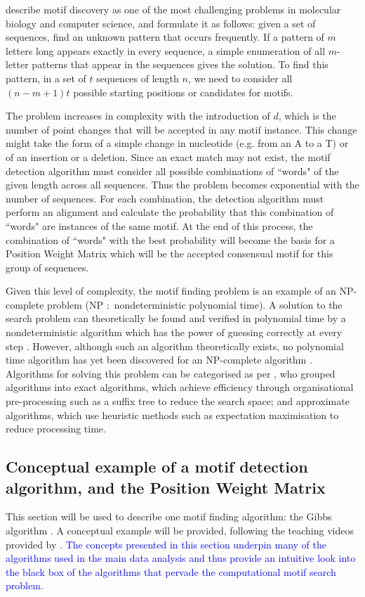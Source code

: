 \documentclass[12pt]{article}
\begin{document}
\citet{das2007survey} describe motif discovery as one of the most challenging problems in molecular biology and computer science, and formulate it as follows:
given a set of sequences, find an unknown pattern that occurs frequently. If a pattern of $m$ letters long appears exactly in every sequence, a simple enumeration of all $m$-letter patterns that appear in the sequences gives the solution. To find this pattern, in a set of $t$ sequences of length $n$, we need to consider all $(n - m +1)t$ possible starting positions or candidates for motifs. 

The problem increases in complexity with the introduction of $d$, which is the number of point changes that will be accepted in any motif instance. This change might take the form of a simple change in nucleotide (e.g. from an A to a T) or of an insertion or a deletion. Since an exact match may not exist, the motif detection algorithm must consider all possible combinations of ``words" of the given length across all sequences. Thus the problem becomes exponential with the number of sequences. For each combination, the detection algorithm must perform an alignment and calculate the probability that this combination of ``words" are instances of the same motif. At the end of this process, the combination of ``words" with the best probability will become the basis for a Position Weight Matrix which will be the accepted consensual motif for this group of sequences. 

Given this level of complexity, the motif finding problem is an example of an NP-complete problem \citep{tran2014survey} (NP $:$ nondeterministic polynomial time). A solution to the search problem can theoretically be found and verified in polynomial time by a nondeterministic algorithm which has the power of guessing correctly at every step \citep{dasgupta2006algorithms}. However, although such an algorithm theoretically exists, no polynomial time algorithm has yet been discovered for an NP-complete algorithm \citep{cormen2009introduction}.  Algorithms for solving this problem can be categorised as per \citep{sun2015affinity}, who grouped algorithms into exact algorithms, which achieve efficiency through organisational pre-processing such as a suffix tree to reduce the search space; and approximate algorithms, which use heuristic methods such as expectation maximisation to reduce processing time.

\subsection{Conceptual example of a motif detection algorithm, and the Position Weight Matrix}
This section will be used to describe one motif finding algorithm: the Gibbs algorithm \citep{Lawrence1993Gibbs}. A conceptual example will be provided, following the teaching videos provided by \citep{Algoshareify}. \textcolor{blue}{The concepts presented in this section underpin many of the algorithms
used in the main data analysis and thus provide an intuitive look into the black box of the algorithms that pervade the computational motif search problem.} 
\end{document}
